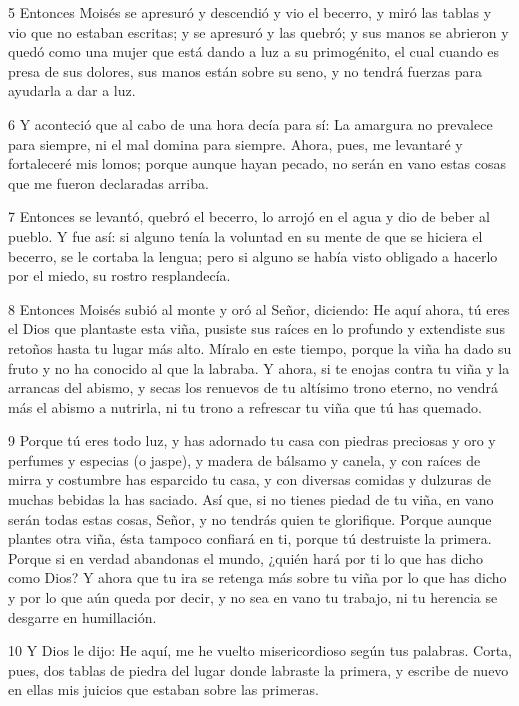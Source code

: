 \par 5 Entonces Moisés se apresuró y descendió y vio el becerro, y miró las tablas y vio que no estaban escritas; y se apresuró y las quebró; y sus manos se abrieron y quedó como una mujer que está dando a luz a su primogénito, el cual cuando es presa de sus dolores, sus manos están sobre su seno, y no tendrá fuerzas para ayudarla a dar a luz.

\par 6 Y aconteció que al cabo de una hora decía para sí: La amargura no prevalece para siempre, ni el mal domina para siempre. Ahora, pues, me levantaré y fortaleceré mis lomos; porque aunque hayan pecado, no serán en vano estas cosas que me fueron declaradas arriba.

\par 7 Entonces se levantó, quebró el becerro, lo arrojó en el agua y dio de beber al pueblo. Y fue así: si alguno tenía la voluntad en su mente de que se hiciera el becerro, se le cortaba la lengua; pero si alguno se había visto obligado a hacerlo por el miedo, su rostro resplandecía.

\par 8 Entonces Moisés subió al monte y oró al Señor, diciendo: He aquí ahora, tú eres el Dios que plantaste esta viña, pusiste sus raíces en lo profundo y extendiste sus retoños hasta tu lugar más alto. Míralo en este tiempo, porque la viña ha dado su fruto y no ha conocido al que la labraba. Y ahora, si te enojas contra tu viña y la arrancas del abismo, y secas los renuevos de tu altísimo trono eterno, no vendrá más el abismo a nutrirla, ni tu trono a refrescar tu viña que tú has quemado.

\par 9 Porque tú eres todo luz, y has adornado tu casa con piedras preciosas y oro y perfumes y especias (o jaspe), y madera de bálsamo y canela, y con raíces de mirra y costumbre has esparcido tu casa, y con diversas comidas y dulzuras de muchas bebidas la has saciado. Así que, si no tienes piedad de tu viña, en vano serán todas estas cosas, Señor, y no tendrás quien te glorifique. Porque aunque plantes otra viña, ésta tampoco confiará en ti, porque tú destruiste la primera. Porque si en verdad abandonas el mundo, ¿quién hará por ti lo que has dicho como Dios? Y ahora que tu ira se retenga más sobre tu viña por lo que has dicho y por lo que aún queda por decir, y no sea en vano tu trabajo, ni tu herencia se desgarre en humillación.

\par 10 Y Dios le dijo: He aquí, me he vuelto misericordioso según tus palabras. Corta, pues, dos tablas de piedra del lugar donde labraste la primera, y escribe de nuevo en ellas mis juicios que estaban sobre las primeras.

